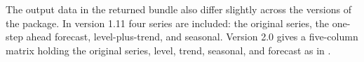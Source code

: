 \documentclass{article}
\begin{document}
The output data in the returned bundle also differ slightly across the
versions of the package. In version 1.11 four series are included: the
original series, the one-step ahead forecast, level-plus-trend, and
seasonal. Version 2.0 gives a five-column matrix holding the original
series, level, trend, seasonal, and forecast as in \cite{hyndman2021}.



\end{document}
